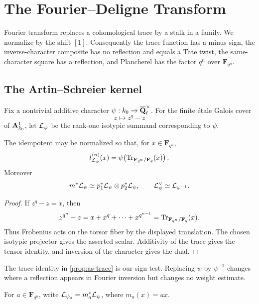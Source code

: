 \chapter{The Fourier--Deligne Transform}
\label{chap:fourier}

Fourier transform replaces a cohomological trace by a stalk in a family.
We normalize by the shift \([1]\).  Consequently the trace function has
a minus sign, the inverse-character composite has no reflection and
equals a Tate twist, the same-character square has a reflection, and
Plancherel has the factor \(q^n\) over \(\mathbf F_{q^n}\).

\section{The Artin--Schreier kernel}

Fix a nontrivial additive character
\(\psi:k_0\to\overline{\mathbf Q}_\ell^\times\).  For the finite \'etale Galois cover
\[
  z\longmapsto z^q-z
\]
of \(\mathbf A^1_{k_0}\), let \(\mathcal L_\psi\) be the rank-one isotypic summand
corresponding to \(\psi\).

\begin{proposition}
\label{prop:as-trace}
The idempotent may be normalized so that, for
\(x\in\mathbf F_{q^n}\),
\[
  t_{\mathcal L_\psi}^{(n)}(x)
  =\psi\!\left(\operatorname{Tr}_{\mathbf F_{q^n}/\mathbf F_q}(x)\right).
\]
Moreover
\[
  m^*\mathcal L_\psi\simeq p_1^*\mathcal L_\psi\otimes p_2^*\mathcal L_\psi,
  \qquad
  \mathcal L_\psi^\vee\simeq\mathcal L_{\psi^{-1}}.
\]
\end{proposition}

\begin{proof}
If \(z^q-z=x\), then
\[
 z^{q^n}-z=x+x^q+\cdots+x^{q^{n-1}}
 =\operatorname{Tr}_{\mathbf F_{q^n}/\mathbf F_q}(x).
\]
Thus Frobenius acts on the torsor fiber by the displayed translation.
The chosen isotypic projector gives the asserted scalar.  Additivity of
the trace gives the tensor identity, and inversion of the character
gives the dual.
\end{proof}

\begin{convention}
\label{conv:as-sign}
The trace identity in \cref{prop:as-trace} is our sign test.  Replacing
\(\psi\) by \(\psi^{-1}\) changes where a reflection appears in Fourier
inversion but changes no weight estimate.
\end{convention}

For \(a\in\mathbf F_{q^n}\), write
\(\mathcal L_{\psi_a}=m_a^*\mathcal L_\psi\), where \(m_a(x)=ax\).

